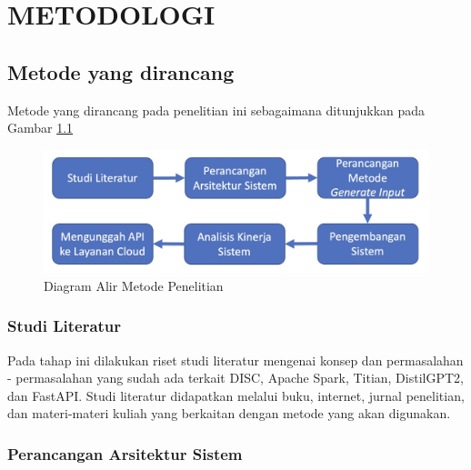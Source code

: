 \chapter{METODOLOGI}
\label{chap:metodologi}

\section{Metode yang dirancang}
\label{sec:metode yang dirancang}

Metode yang dirancang pada penelitian ini sebagaimana ditunjukkan pada Gambar \ref{fig:metode}

\begin{figure}[H]
  \centering
  \includegraphics[scale=0.26]{gambar/DiagramAlirMetodePenelitian.jpg}

  \caption{Diagram Alir Metode Penelitian}
  \label{fig:metode}
\end{figure}

\subsection{Studi Literatur}
\label{subsec:studiliteratur}

  
  Pada tahap ini dilakukan riset studi literatur mengenai konsep 
  dan permasalahan - permasalahan yang sudah ada terkait DISC, 
  Apache Spark, Titian, DistilGPT2, dan FastAPI. Studi literatur didapatkan melalui buku, internet, jurnal penelitian, dan materi-materi kuliah yang berkaitan dengan metode yang akan digunakan.

  \subsection{Perancangan Arsitektur Sistem}
  \label{subsec:perancanganarsitektursistem}
  
